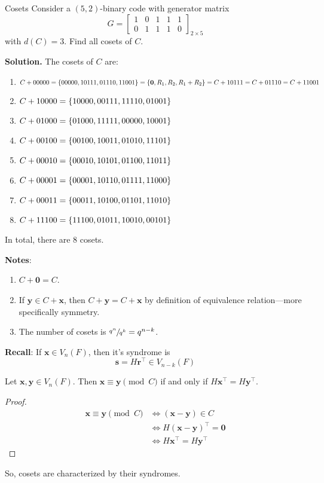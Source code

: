 \begin{Example}{Cosets}{}
    Consider a $ (5,2) $-binary code with generator matrix
    \[ G=\begin{bmatrix}
            1 & 0 & 1 & 1 & 1 \\
            0 & 1 & 1 & 1 & 0
        \end{bmatrix}_{2\times 5} \]
    with $ d(C)=3 $. Find all cosets of $ C $.

    \textbf{Solution.} The cosets of $ C $ are:
    \begin{enumerate}[label=(\arabic*)]
        \item $ C+00000=\{00000,10111,01110,11001\}=\{\bm{0},R_1,R_2, R_1+R_2\}
                  = C+10111 = C+01110 = C + 11001 $
        \item $ C+10000=\{10000,00111,11110,01001\} $
        \item $ C+01000=\{01000,11111,00000,10001\} $
        \item $ C+00100=\{00100,10011,01010,11101\} $
        \item $ C+00010=\{00010,10101,01100,11011\} $
        \item $ C+00001=\{00001,10110,01111,11000\} $
        \item $ C+00011=\{00011,10100,01101,11010\} $
        \item $ C+11100=\{11100,01011,10010,00101\} $
    \end{enumerate}
    In total, there are $ 8 $ cosets.
\end{Example}

\textbf{Notes}:
\begin{enumerate}[label=(\arabic*)]
    \item $ C+\bm{0}=C $.
    \item If $ \bm{y}\in C+\bm{x} $, then $ C+\bm{y}=C+\bm{x} $ by definition
          of equivalence relation---more specifically symmetry.
    \item The number of cosets is $ \sfrac{q^n}{q^k}=q^{n-k} $.
\end{enumerate}

\textbf{Recall}: If $ \bm{x}\in V_n(F) $, then it's syndrome is
\[ \bm{s}=H\bm{r}^\top\in V_{n-k}(F) \]

\begin{Theorem}{}{}
    Let $ \bm{x},\bm{y}\in V_n(F) $. Then $ \bm{x}\equiv \bm{y}\pmod{C} $
    if and only if $ H\bm{x}^\top=H\bm{y}^\top $.
\end{Theorem}

\begin{proof}
    \begin{align*}
        \bm{x}\equiv \bm{y}\pmod{C}
         & \iff (\bm{x}-\bm{y})\in C         \\
         & \iff H(\bm{x}-\bm{y})^\top=\bm{0} \\
         & \iff H\bm{x}^\top=H\bm{y}^\top
    \end{align*}
\end{proof}
So, cosets are characterized by their syndromes.

